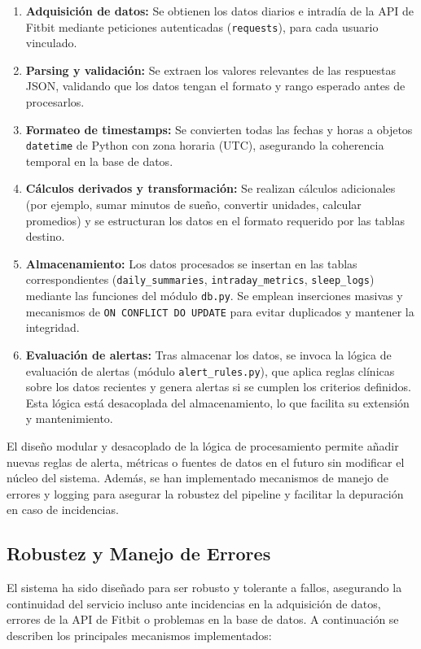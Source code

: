 \begin{enumerate}
    \item \textbf{Adquisición de datos:} Se obtienen los datos diarios e intradía de la API de Fitbit mediante peticiones autenticadas (\texttt{requests}), para cada usuario vinculado.
    \item \textbf{Parsing y validación:} Se extraen los valores relevantes de las respuestas JSON, validando que los datos tengan el formato y rango esperado antes de procesarlos.
    \item \textbf{Formateo de timestamps:} Se convierten todas las fechas y horas a objetos \texttt{datetime} de Python con zona horaria (UTC), asegurando la coherencia temporal en la base de datos.
    \item \textbf{Cálculos derivados y transformación:} Se realizan cálculos adicionales (por ejemplo, sumar minutos de sueño, convertir unidades, calcular promedios) y se estructuran los datos en el formato requerido por las tablas destino.
    \item \textbf{Almacenamiento:} Los datos procesados se insertan en las tablas correspondientes (\texttt{daily\_summaries}, \texttt{intraday\_metrics}, \texttt{sleep\_logs}) mediante las funciones del módulo \texttt{db.py}. Se emplean inserciones masivas y mecanismos de \texttt{ON CONFLICT DO UPDATE} para evitar duplicados y mantener la integridad.
    \item \textbf{Evaluación de alertas:} Tras almacenar los datos, se invoca la lógica de evaluación de alertas (módulo \texttt{alert\_rules.py}), que aplica reglas clínicas sobre los datos recientes y genera alertas si se cumplen los criterios definidos. Esta lógica está desacoplada del almacenamiento, lo que facilita su extensión y mantenimiento.
\end{enumerate}

El diseño modular y desacoplado de la lógica de procesamiento permite añadir nuevas reglas de alerta, métricas o fuentes de datos en el futuro sin modificar el núcleo del sistema. Además, se han implementado mecanismos de manejo de errores y logging para asegurar la robustez del pipeline y facilitar la depuración en caso de incidencias.

\subsection{Robustez y Manejo de Errores}
\label{subsec:robustez_errores}

El sistema ha sido diseñado para ser robusto y tolerante a fallos, asegurando la continuidad del servicio incluso ante incidencias en la adquisición de datos, errores de la API de Fitbit o problemas en la base de datos. A continuación se describen los principales mecanismos implementados:

